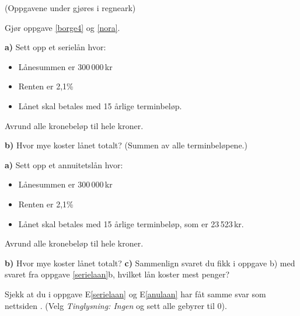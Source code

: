 




\opgt

\vsk
(Oppgavene under gjøres i regneark) \vsk

Gjør oppgave \ref{borge4} og \ref{nora}.

\textbf{a)} Sett opp et serielån hvor:
\begin{itemize}
	\item Lånesummen er 300\,000\,kr
	\item Renten er 2,1\%
	\item Lånet skal betales med 15 årlige terminbeløp.
\end{itemize}
Avrund alle kronebeløp til hele kroner.\os

\textbf{b)} Hvor mye koster lånet totalt? (Summen av alle terminbeløpene.)

\textbf{a)} Sett opp et annuitetslån hvor:
\begin{itemize}
	\item Lånesummen er 300\,000\,kr
	\item Renten er 2,1\%
	\item Lånet skal betales med 15 årlige terminbeløp, som er 23\,523\,kr.
\end{itemize}
Avrund alle kronebeløp til hele kroner.\os

\textbf{b)} Hvor mye koster lånet totalt? \os
\textbf{c)} Sammenlign svaret du fikk i oppgave b) med svaret fra oppgave \ref{serielaan}b, hvilket lån koster mest penger?\os

Sjekk at du i oppgave E\ref{serielaan} og E\ref{anulaan} har fåt samme svar som nettsiden . (Velg \textsl{Tinglysning: Ingen} og sett alle gebyrer til 0).


